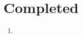 \newpage\twocolumn\tiny\section*{Completed}\begin{enumerate}






\item \lipsum







\end{enumerate}
